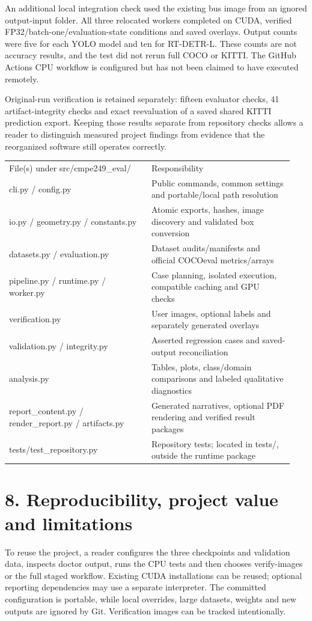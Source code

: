\documentclass[10pt]{article}
\begin{document}
An additional local integration check used the existing bus image from an ignored output-input folder. All three relocated workers completed on CUDA, verified FP32/batch-one/evaluation-state conditions and saved overlays. Output counts were five for each YOLO model and ten for RT-DETR-L. These counts are not accuracy results, and the test did not rerun full COCO or KITTI. The GitHub Actions CPU workflow is configured but has not been claimed to have executed remotely.


Original-run verification is retained separately: fifteen evaluator checks, 41 artifact-integrity checks and exact reevaluation of a saved shared KITTI prediction export. Keeping those results separate from repository checks allows a reader to distinguish measured project findings from evidence that the reorganized software still operates correctly.


\begin{longtable}{p{0.470\linewidth}p{0.470\linewidth}}
File(s) under src/cmpe249\_eval/ & Responsibility \\
cli.py / config.py & Public commands, common settings and portable/local path resolution \\
io.py / geometry.py / constants.py & Atomic exports, hashes, image discovery and validated box conversion \\
datasets.py / evaluation.py & Dataset audits/manifests and official COCOeval metrics/arrays \\
pipeline.py / runtime.py / worker.py & Case planning, isolated execution, compatible caching and GPU checks \\
verification.py & User images, optional labels and separately generated overlays \\
validation.py / integrity.py & Asserted regression cases and saved-output reconciliation \\
analysis.py & Tables, plots, class/domain comparisons and labeled qualitative diagnostics \\
report\_content.py / render\_report.py / artifacts.py & Generated narratives, optional PDF rendering and verified result packages \\
tests/test\_repository.py & Repository tests; located in tests/, outside the runtime package \\
\end{longtable}
\clearpage
\section*{8. Reproducibility, project value and limitations}
To reuse the project, a reader configures the three checkpoints and validation data, inspects doctor output, runs the CPU tests and then chooses verify-images or the full staged workflow. Existing CUDA installations can be reused; optional reporting dependencies may use a separate interpreter. The committed configuration is portable, while local overrides, large datasets, weights and new outputs are ignored by Git. Verification images can be tracked intentionally.
\end{document}
